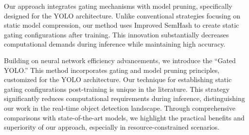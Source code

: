 Our approach integrates gating mechanisms with model pruning, specifically designed for the YOLO architecture. Unlike conventional strategies focusing on static model compression, our method uses Improved SemHash to create static gating configurations after training. This innovation substantially decreases computational demands during inference while maintaining high accuracy.

Building on neural network efficiency advancements, we introduce the ``Gated YOLO.'' This method incorporates gating and model pruning principles, customized for the YOLO architecture. Our technique for establishing static gating configurations post-training is unique in the literature. This strategy significantly reduces computational requirements during inference, distinguishing our work in the real-time object detection landscape. Through comprehensive comparisons with state-of-the-art models, we highlight the practical benefits and superiority of our approach, especially in resource-constrained scenarios.


\clearpage
